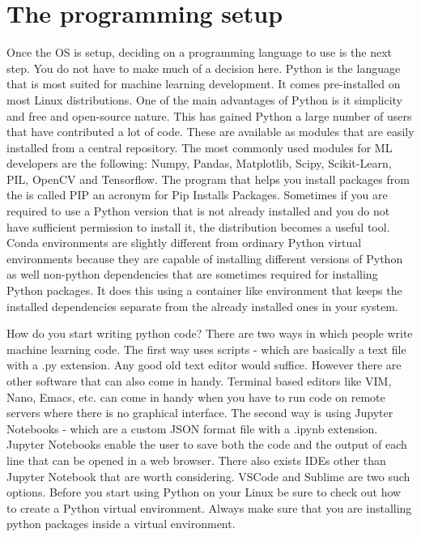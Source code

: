 \documentclass{../template/texnote}
\begin{document}
\section{The programming setup}
Once the OS is setup, deciding on a programming language to use is the next step. You do not have to make much of a decision here. Python is the language that is most suited for machine learning development. It comes pre-installed on most Linux distributions. One of the main advantages of Python is it simplicity and free and open-source nature. This has gained Python a large number of users that have contributed a lot of code. These are available as modules that are easily installed from a central repository. The most commonly used modules for ML developers are the following: Numpy, Pandas, Matplotlib, Scipy, Scikit-Learn, PIL, OpenCV and Tensorflow. The program that helps you install packages from the \cite{pypi} is called PIP an acronym for Pip Installs Packages. Sometimes if you are required to use a Python version that is not already installed and you do not have sufficient permission to install it, the \cite{miniconda} distribution becomes a useful tool. Conda environments are slightly different from ordinary Python virtual environments because they are capable of installing different versions of Python as well non-python dependencies that are sometimes required for installing Python packages. It does this using a container like environment that keeps the installed dependencies separate from the already installed ones in your system. 

How do you start writing python code? There are two ways in which people write machine learning code. The first way uses scripts - which are basically a text file with a .py extension. Any good old text editor would suffice. However there are other software that can also come in handy. Terminal based editors like VIM, Nano, Emacs, etc. can come in handy when you have to run code on remote servers where there is no graphical interface. The second way is using Jupyter Notebooks - which are a custom JSON format file with a .ipynb extension. Jupyter Notebooks enable the user to save both the code and the output of each line that can be opened in a web browser. There also exists IDEs other than Jupyter Notebook that are worth considering. VSCode and Sublime are two such options. Before you start using Python on your Linux be sure to check out how to create a Python virtual environment. Always make sure that you are installing python packages inside a virtual environment. 
\end{document}

